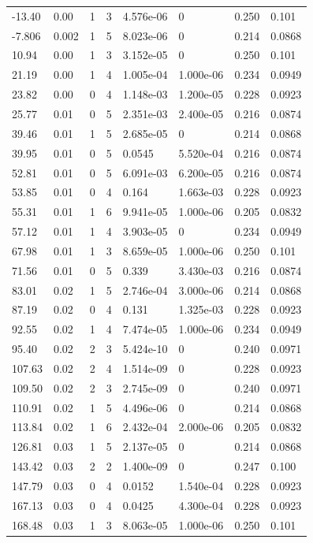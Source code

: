 \documentclass[preview]{standalone}
\begin{document}
{{\begin{tabular}{L{1.2cm}C{1.2cm} C{0.3cm}C{0.5cm} C{1.4cm}C{1.4cm} C{1.4cm}C{1.4cm}}
  -13.40  &  0.00  & 1     &  3 &  4.576e-06  & 0  & 0.250 &  0.101   \\ 
  -7.806  &  0.002  & 1     &  5 &  8.023e-06  & 0  & 0.214 &  0.0868   \\ 
  10.94  &  0.00  & 1     &  3 &  3.152e-05  & 0  & 0.250 &  0.101   \\ 
  21.19  &  0.00  & 1     &  4 &  1.005e-04  & 1.000e-06  & 0.234 &  0.0949   \\ 
  23.82  &  0.00  & 0     &  4 &  1.148e-03  & 1.200e-05  & 0.228 &  0.0923   \\ 
  25.77  &  0.01  & 0     &  5 &  2.351e-03  & 2.400e-05  & 0.216 &  0.0874   \\ 
  39.46  &  0.01  & 1     &  5 &  2.685e-05  & 0  & 0.214 &  0.0868   \\ 
  39.95  &  0.01  & 0     &  5 &  0.0545  & 5.520e-04  & 0.216 &  0.0874   \\ 
  52.81  &  0.01  & 0     &  5 &  6.091e-03  & 6.200e-05  & 0.216 &  0.0874   \\ 
  53.85  &  0.01  & 0     &  4 &  0.164  & 1.663e-03  & 0.228 &  0.0923   \\ 
  55.31  &  0.01  & 1     &  6 &  9.941e-05  & 1.000e-06  & 0.205 &  0.0832   \\ 
  57.12  &  0.01  & 1     &  4 &  3.903e-05  & 0  & 0.234 &  0.0949   \\ 
  67.98  &  0.01  & 1     &  3 &  8.659e-05  & 1.000e-06  & 0.250 &  0.101   \\ 
  71.56  &  0.01  & 0     &  5 &  0.339  & 3.430e-03  & 0.216 &  0.0874   \\ 
  83.01  &  0.02  & 1     &  5 &  2.746e-04  & 3.000e-06  & 0.214 &  0.0868   \\ 
  87.19  &  0.02  & 0     &  4 &  0.131  & 1.325e-03  & 0.228 &  0.0923   \\ 
  92.55  &  0.02  & 1     &  4 &  7.474e-05  & 1.000e-06  & 0.234 &  0.0949   \\ 
  95.40  &  0.02  & 2     &  3 &  5.424e-10  & 0  & 0.240 &  0.0971   \\ 
  107.63  &  0.02  & 2     &  4 &  1.514e-09  & 0  & 0.228 &  0.0923   \\ 
  109.50  &  0.02  & 2     &  3 &  2.745e-09  & 0  & 0.240 &  0.0971   \\ 
  110.91  &  0.02  & 1     &  5 &  4.496e-06  & 0  & 0.214 &  0.0868   \\ 
  113.84  &  0.02  & 1     &  6 &  2.432e-04  & 2.000e-06  & 0.205 &  0.0832   \\ 
  126.81  &  0.03  & 1     &  5 &  2.137e-05  & 0  & 0.214 &  0.0868   \\ 
  143.42  &  0.03  & 2     &  2 &  1.400e-09  & 0  & 0.247 &  0.100   \\ 
  147.79  &  0.03  & 0     &  4 &  0.0152  & 1.540e-04  & 0.228 &  0.0923   \\ 
  167.13  &  0.03  & 0     &  4 &  0.0425  & 4.300e-04  & 0.228 &  0.0923   \\ 
  168.48  &  0.03  & 1     &  3 &  8.063e-05  & 1.000e-06  & 0.250 &  0.101   \\ 
\hline 
\end{tabular} 

}}
\end{document}
